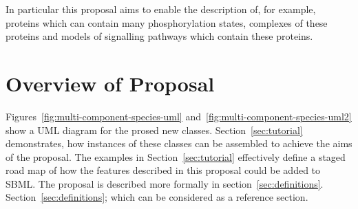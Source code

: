 \documentclass{cekarticle}
\begin{document}
In particular this proposal aims to enable the description of, for example, proteins which
can contain many phosphorylation states,
complexes of these proteins and models of signalling pathways which contain these proteins.

\clearpage

\section{Overview of Proposal}

Figures~\ref{fig:multi-component-species-uml}
and~\ref{fig:multi-component-species-uml2} show a UML diagram for
the prosed new classes. Section~\ref{sec:tutorial} demonstrates,
how instances of these classes can be assembled to achieve the
aims of the proposal.  The examples in Section~\ref{sec:tutorial}
effectively define a staged road map of how the features described
in this proposal could be added to SBML. The proposal is described
more formally in section~\ref{sec:definitions}.
Section~\ref{sec:definitions}; which can be considered as a
reference section.
\end{document}
